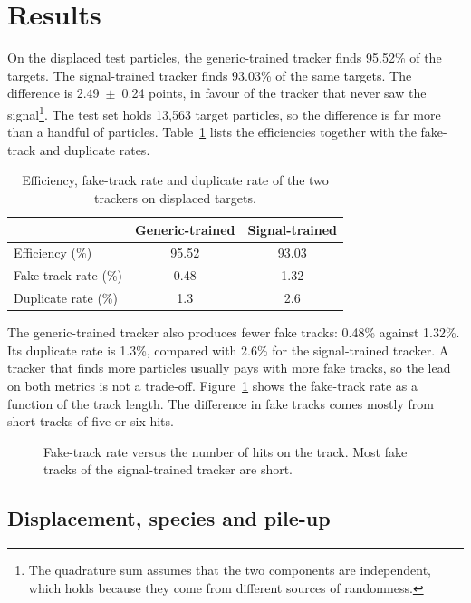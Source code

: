 \section{Results}
\label{sec:results}

On the displaced test particles, the generic-trained tracker finds 95.52\% of the targets. The
signal-trained tracker finds 93.03\% of the same targets. The difference is 2.49~$\pm$~0.24 points,
in favour of the tracker that never saw the signal\footnote{The quadrature sum assumes that the two
components are independent, which holds because they come from different sources of randomness.}.
The test set holds 13,563 target particles, so the difference is far more than a handful of
particles. Table~\ref{tab:headline} lists the efficiencies together with the fake-track and
duplicate rates.

\begin{table}[tbp]
  \caption{Efficiency, fake-track rate and duplicate rate of the two trackers on displaced targets.}
  \label{tab:headline}
  \centering
  \begin{tabular}{lcc}
    \hline\hline
     & Generic-trained & Signal-trained \\
    \hline
    Efficiency (\%) & 95.52 & 93.03 \\
    Fake-track rate (\%) & 0.48 & 1.32 \\
    Duplicate rate (\%) & 1.3 & 2.6 \\
    \hline\hline
  \end{tabular}
\end{table}

The generic-trained tracker also produces fewer fake tracks: 0.48\% against 1.32\%. Its duplicate
rate is 1.3\%, compared with 2.6\% for the signal-trained tracker. A tracker that finds more
particles usually pays with more fake tracks, so the lead on both metrics is not a trade-off.
Figure~\ref{fig:fake} shows the fake-track rate as a function of the track length. The difference in
fake tracks comes mostly from short tracks of five or six hits.

\begin{figure}[tbp]
  \centering
  \caption{Fake-track rate versus the number of hits on the track. Most fake tracks of the signal-trained tracker are short.}
  \label{fig:fake}
\end{figure}

\subsection{Displacement, species and pile-up}
\label{sec:dependence}

